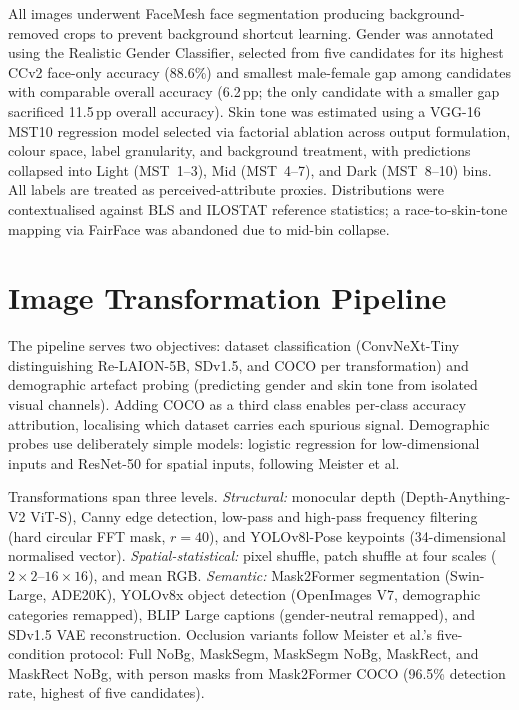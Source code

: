 All images underwent FaceMesh face segmentation producing background-removed crops to
prevent background shortcut learning. Gender was annotated using the Realistic Gender
Classifier, selected from five candidates for its highest CCv2 face-only accuracy
(88.6\%) and smallest male-female gap among candidates with comparable overall accuracy
(6.2\,pp; the only candidate with a smaller gap sacrificed 11.5\,pp overall accuracy).
Skin tone was estimated using a VGG-16 MST10 regression model selected via factorial
ablation across output formulation, colour space, label granularity, and background
treatment, with predictions collapsed into Light (MST~1--3), Mid (MST~4--7), and Dark
(MST~8--10) bins. All labels are treated as perceived-attribute proxies. Distributions
were contextualised against BLS and ILOSTAT reference statistics; a race-to-skin-tone
mapping via FairFace was abandoned due to mid-bin collapse.

\section{Image Transformation Pipeline}

The pipeline serves two objectives: dataset classification (ConvNeXt-Tiny distinguishing
Re-LAION-5B, SDv1.5, and COCO per transformation) and demographic artefact probing
(predicting gender and skin tone from isolated visual channels). Adding COCO as a third
class enables per-class accuracy attribution, localising which dataset carries each
spurious signal. Demographic probes use deliberately simple models: logistic regression
for low-dimensional inputs and ResNet-50 for spatial inputs, following Meister et al.

Transformations span three levels. \textit{Structural:} monocular depth (Depth-Anything-V2
ViT-S), Canny edge detection, low-pass and high-pass frequency filtering (hard circular
FFT mask, $r{=}40$), and YOLOv8l-Pose keypoints (34-dimensional normalised vector).
\textit{Spatial-statistical:} pixel shuffle, patch shuffle at four scales
($2{\times}2$--$16{\times}16$), and mean RGB. \textit{Semantic:} Mask2Former
segmentation (Swin-Large, ADE20K), YOLOv8x object detection (OpenImages V7, demographic
categories remapped), BLIP Large captions (gender-neutral remapped), and SDv1.5 VAE
reconstruction. Occlusion variants follow Meister et al.'s five-condition protocol: Full
NoBg, MaskSegm, MaskSegm NoBg, MaskRect, and MaskRect NoBg, with person masks from
Mask2Former COCO (96.5\% detection rate, highest of five candidates).

